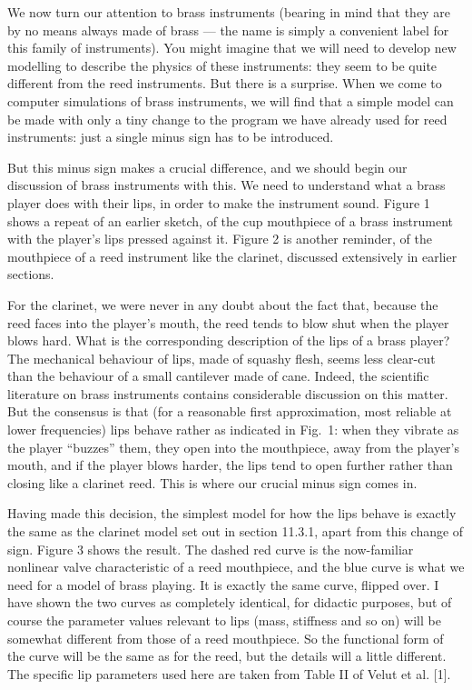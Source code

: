 

  We now turn our attention to brass instruments (bearing in mind that they are 
  by no means always made of brass — the name is simply a convenient label for 
  this family of instruments). You might imagine that we will need to develop 
  new modelling to describe the physics of these instruments: they seem to be 
  quite different from the reed instruments. But there is a surprise. When we 
  come to computer simulations of brass instruments, we will find that a simple 
  model can be made with only a tiny change to the program we have already used 
  for reed instruments: just a single minus sign has to be introduced. 


  But this minus sign makes a crucial difference, and we should begin our 
  discussion of brass instruments with this. We need to understand what a brass 
  player does with their lips, in order to make the instrument sound. Figure 1 
  shows a repeat of an earlier sketch, of the cup mouthpiece of a brass 
  instrument with the player’s lips pressed against it. Figure 2 is another 
  reminder, of the mouthpiece of a reed instrument like the clarinet, discussed 
  extensively in earlier sections. 

  For the clarinet, we were never in any doubt about the fact that, because the 
  reed faces into the player’s mouth, the reed tends to blow shut when the 
  player blows hard. What is the corresponding description of the lips of a 
  brass player? The mechanical behaviour of lips, made of squashy flesh, seems 
  less clear-cut than the behaviour of a small cantilever made of cane. Indeed, 
  the scientific literature on brass instruments contains considerable 
  discussion on this matter. But the consensus is that (for a reasonable first 
  approximation, most reliable at lower frequencies) lips behave rather as 
  indicated in Fig.\ 1: when they vibrate as the player ``buzzes'' them, they 
  open into the mouthpiece, away from the player’s mouth, and if the player 
  blows harder, the lips tend to open further rather than closing like a 
  clarinet reed. This is where our crucial minus sign comes in. 

  Having made this decision, the simplest model for how the lips behave is 
  exactly the same as the clarinet model set out in section 11.3.1, apart from 
  this change of sign. Figure 3 shows the result. The dashed red curve is the 
  now-familiar nonlinear valve characteristic of a reed mouthpiece, and the 
  blue curve is what we need for a model of brass playing. It is exactly the 
  same curve, flipped over. I have shown the two curves as completely 
  identical, for didactic purposes, but of course the parameter values relevant 
  to lips (mass, stiffness and so on) will be somewhat different from those of 
  a reed mouthpiece. So the functional form of the curve will be the same as 
  for the reed, but the details will a little different. The specific lip 
  parameters used here are taken from Table II of Velut et al. [1]. 

